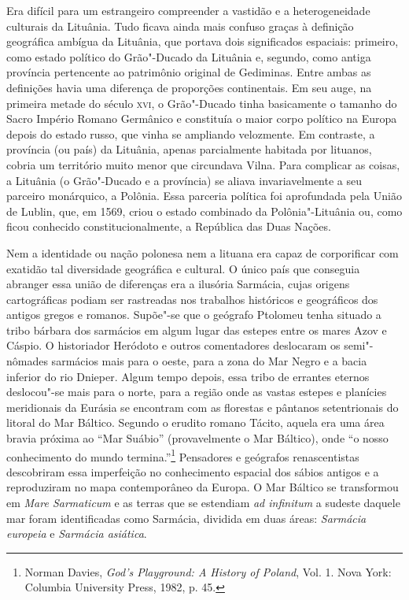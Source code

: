 Era difícil para um estrangeiro compreender a vastidão e a
heterogeneidade culturais da Lituânia. Tudo ficava ainda mais confuso
graças à definição geográfica ambígua da Lituânia, que portava dois
significados espaciais: primeiro, como estado político do Grão"-Ducado da
Lituânia e, segundo, como antiga província pertencente ao patrimônio
original de Gediminas. Entre ambas as definições havia uma diferença de
proporções continentais. Em seu auge, na primeira metade do século \textsc{xvi}, o
Grão"-Ducado tinha basicamente o tamanho do Sacro Império Romano
Germânico e constituía o maior corpo político na Europa depois do estado
russo, que vinha se ampliando velozmente. Em contraste, a província (ou
país) da Lituânia, apenas parcialmente habitada por lituanos, cobria um
território muito menor que circundava Vilna. Para complicar as coisas, a
Lituânia (o Grão"-Ducado e a província) se aliava invariavelmente a seu
parceiro monárquico, a Polônia. Essa parceria política foi aprofundada
pela União de Lublin, que, em 1569, criou o estado combinado da
Polônia"-Lituânia ou, como ficou conhecido constitucionalmente, a
República das Duas Nações.

%

\asterisc

Nem a identidade ou nação polonesa nem a lituana era capaz de
corporificar com exatidão tal diversidade geográfica e cultural. O único
país que conseguia abranger essa união de diferenças era a ilusória
Sarmácia, cujas origens cartográficas podiam ser rastreadas nos
trabalhos históricos e geográficos dos antigos gregos e romanos.
Supõe"-se que o geógrafo Ptolomeu tenha situado a tribo bárbara dos
sarmácios em algum lugar das estepes entre os mares Azov e Cáspio. O
historiador Heródoto e outros comentadores deslocaram os semi"-nômades
sarmácios mais para o oeste, para a zona do Mar Negro e a bacia inferior
do rio Dnieper. Algum tempo depois, essa tribo de errantes eternos
deslocou"-se mais para o norte, para a região onde as vastas estepes e
planícies meridionais da Eurásia se encontram com as florestas e
pântanos setentrionais do litoral do Mar Báltico. Segundo o erudito
romano Tácito, aquela era uma área bravia próxima ao ``Mar Suábio''
(provavelmente o Mar Báltico), onde ``o nosso conhecimento do mundo
termina.''\footnote{Norman Davies, \textit{God's Playground: A History of Poland}, Vol. 1. Nova York: Columbia University Press, 1982, p. 45.} Pensadores e geógrafos renascentistas descobriram essa imperfeição no conhecimento espacial dos sábios antigos e a reproduziram
no mapa contemporâneo da Europa. O Mar Báltico se transformou em
\textit{Mare Sarmaticum} e as terras que se estendiam \textit{ad infinitum}
a sudeste daquele mar foram identificadas como Sarmácia, dividida em
duas áreas: \textit{Sarmácia europeia} e \textit{Sarmácia asiática}.

